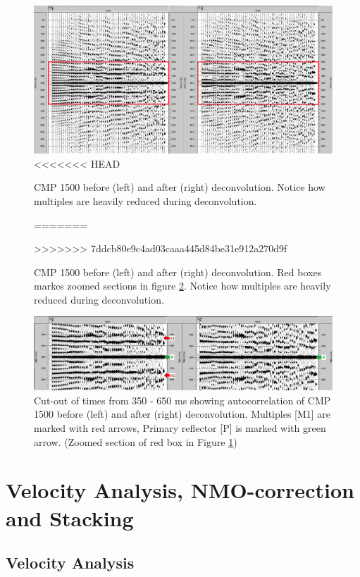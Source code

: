 \documentclass[10pt,a4paper]{article}
\begin{document}
\begin{figure}[H]
\includegraphics[width=\textwidth]{fig19.jpg}
<<<<<<< HEAD
\caption{CMP 1500 before (left) and after (right) deconvolution. Notice how multiples are heavily reduced during deconvolution.}
=======
\caption{CMP 1500 before (left) and after (right) deconvolution. Red boxes markes zoomed sections in figure \ref{fig20}. Notice how multiples are heavily reduced during deconvolution.}
>>>>>>> 7ddcb80e9c4ad03caaa445d84be31e912a270d9f
\label{fig19}
\end{figure}

\begin{figure}[H]
\includegraphics[width=\textwidth]{fig20.jpg}
\caption{Cut-out of times from 350 - 650 ms showing autocorrelation of CMP 1500 before (left) and after (right) deconvolution. Multiples [M1] are marked with red arrows, Primary reflector [P] is marked with green arrow. (Zoomed section of red box in Figure \ref{fig19})}
\label{fig20}
\end{figure}


\section{Velocity Analysis, NMO-correction and Stacking}

\subsection{Velocity Analysis}
\end{document}
